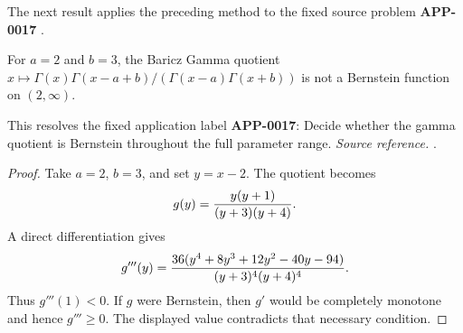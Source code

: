 The next result applies the preceding method to the fixed source problem \textbf{APP-0017} \cite{baricz-turan}.
\begin{counterexample}
\label{res:baricz-gamma-quotient-a2b3-not-bf}
For \(a=2\) and \(b=3\), the Baricz Gamma quotient \(x\mapsto\Gamma(x)\Gamma(x-a+b)/(\Gamma(x-a)\Gamma(x+b))\) is not a Bernstein function on \((2,\infty)\).

This resolves the fixed application label \textbf{APP-0017}: Decide whether the gamma quotient is Bernstein throughout the full parameter range.
\emph{Source reference.} \cite{baricz-turan}.
\end{counterexample}
\begin{proof}
Take \(a=2\), \(b=3\), and set \(y=x-2\).  The quotient becomes
\[
  g(y)={y(y+1)\over (y+3)(y+4)} .
\]
A direct differentiation gives
\[
  g'''(y)=
 {36(y^4+8y^3+12y^2-40y-94)\over (y+3)^4(y+4)^4}.
\]
Thus \(g'''(1)<0\).  If \(g\) were Bernstein, then \(g'\) would be completely
monotone and hence \(g'''\ge0\).  The displayed value contradicts that
necessary condition.
\end{proof}

